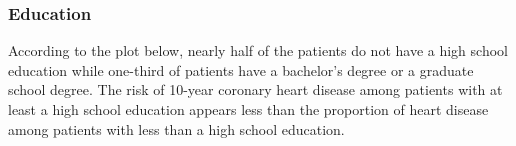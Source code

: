 \documentclass[10pt]{article}
\begin{document}
\begin{figure}[ht!]
\hspace*{\fill}
\centering
{}\hspace{2em}%
%
\hspace*{\fill}
\end{figure}



\subsubsection*{Education}

According to the plot below, nearly half of the patients do not have a high school education while one-third of patients have a bachelor's degree or a graduate school degree. The risk of 10-year coronary heart disease among patients with at least a high school education appears less than the proportion of heart disease among patients with less than a high school education.
\end{document}
